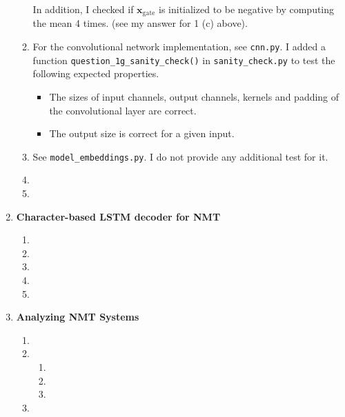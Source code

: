 \documentclass[12pt]{article}
\begin{document}
\begin{enumerate}[label=\textbf{\arabic*.}]
\begin{enumerate}[label=(\alph*)]
    In addition, I checked if $\bm{x}_\text{gate}$ is initialized to be negative by computing the mean 4 times. (see my answer for 1 (c) above).
    \item For the convolutional network implementation, see \texttt{cnn.py}. I added a function \texttt{question\_1g\_sanity\_check()} in \texttt{sanity\_check.py} to test the following expected properties.
    \begin{itemize}
      \item The sizes of input channels, output channels, kernels and padding of the convolutional layer are correct.
      \item The output size is correct for a given input.
    \end{itemize}
    \item See \texttt{model\_embeddings.py}. I do not provide any additional test for it.
    \item
    \item
  \end{enumerate}
  \item \textbf{Character-based LSTM decoder for NMT}
  \begin{enumerate}[label=(\alph*)]
    \item
    \item
    \item
    \item
    \item
  \end{enumerate}
  \item \textbf{Analyzing NMT Systems}
  \begin{enumerate}[label=(\alph*)]
    \item
    \item
    \begin{enumerate}[label=\roman*.]
      \item
      \item
      \item
    \end{enumerate}
    \item
  \end{enumerate}
\end{enumerate}
\end{document}
